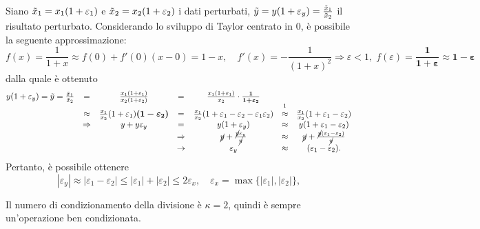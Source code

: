 Siano $\Tilde{x}_1=x_1(1+\varepsilon_1)$ e $ \Tilde{x}_2=x_2(1+\varepsilon_2)$ i dati perturbati,  $\Tilde{y}= y(1+\varepsilon_y)=\frac{\Tilde{x}_1}{\Tilde{x}_2}$ il risultato perturbato. Considerando lo sviluppo di Taylor centrato in 0, è possibile la seguente approssimazione:
\begin{equation*}
	f(x)=\frac{1}{1+x}\approx f(0)+f'(0)(x-0)=1-x,\quad f'(x)=-\frac{1}{(1+x)^2}\Rightarrow \varepsilon<1,\;f(\varepsilon)=\boldsymbol{\frac{1}{1+\varepsilon}\approx1-\varepsilon}
\end{equation*}
dalla quale è ottenuto
\begin{equation*}
	\begin{matrix}
		y(1+\varepsilon_y)=\Tilde{y}=\frac{\Tilde{x}_1}{\Tilde{x}_2}&=&\frac{x_1(1+\varepsilon_1)}{x_2(1+\varepsilon_2)}&=&\frac{x_1(1+\varepsilon_1)}{x_2}\cdot\boldsymbol{\frac{1}{1+\varepsilon_2}}\\
		&\approx&\frac{x_1}{x_2}(1+\varepsilon_1)\boldsymbol{(1-\varepsilon_2)}&=&\frac{x_1}{x_2}(1+\varepsilon_1-\varepsilon_2-\varepsilon_1\varepsilon_2) &\overset{\footnotemark}{\approx}&\frac{x_1}{x_2}(1+\varepsilon_1-\varepsilon_2)\\
		&\Rightarrow&  y+y\varepsilon_y&=&y(1+\varepsilon_y)&\approx&y(1+\varepsilon_1-\varepsilon_2)\\
		&&&\Rightarrow& \cancel{y}+\frac{\cancel{y}\varepsilon_y}{\cancel{y}}&\approx&\cancel{y}+\frac{\cancel{y}(\varepsilon_1-\varepsilon_2)}{\cancel{y}}\\
		&&&\rightarrow& \varepsilon_y &\approx& (\varepsilon_1-\varepsilon_2).
	\end{matrix}
\end{equation*}
Pertanto, è possibile ottenere
\begin{equation*}
	|\varepsilon_y|\approx|\varepsilon_1-\varepsilon_2|\leq |\varepsilon_1|+|\varepsilon_2|\leq 2\varepsilon_x,\quad \varepsilon_x=\max\{|\varepsilon_1|,|\varepsilon_2|\},
\end{equation*}

\begin{definition}
	Il numero di condizionamento della divisione è $\kappa=2$, quindi è sempre un'operazione ben condizionata.
\end{definition}